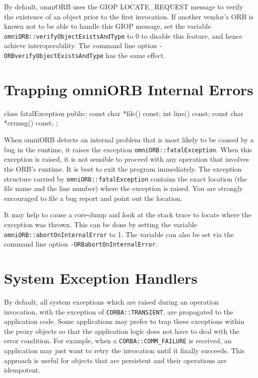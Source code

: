 \documentclass[11pt,twoside,a4paper]{book}
\newcommand{\type}[1]{\texttt{#1}}
\newcommand{\code}[1]{\texttt{#1}}
\newcommand{\cmdline}[1]{\texttt{#1}}
\newcommand{\dsc}{\discretionary{}{}{}}
\begin{document}
By default, omniORB uses the GIOP LOCATE\_REQUEST message to verify
the existence of an object prior to the first invocation. If another
vendor's ORB is known not to be able to handle this GIOP message, set
the variable \code{omniORB::\dsc{}verifyObjectExistsAndType} to 0 to
disable this feature, and hence achieve interoperability. The command
line option \cmdline{-ORBverifyObjectExistsAndType} has the same
effect.



\section{Trapping omniORB Internal Errors}
\label{sec_fatal}

\begin{cxxlisting}
class fatalException {
public:
    const char *file() const;
    int line() const;
    const char *errmsg() const;
};
\end{cxxlisting}

When omniORB detects an internal problem that is most likely to be
caused by a bug in the runtime, it raises the exception
\type{omniORB::fatalException}.  When this exception is raised, it is
not sensible to proceed with any operation that involves the ORB's
runtime. It is best to exit the program immediately. The exception
structure carried by \type{omniORB::fatalException} contains the exact
location (the file name and the line number) where the exception is
raised. You are strongly encouraged to file a bug report and point out
the location.

It may help to cause a core-dump and look at the stack trace to locate
where the exception was thrown. This can be done by setting the
variable \code{omniORB::\dsc{}abortOnInternalError} to 1. The variable
can also be set via the command line option
\cmdline{-ORBabortOnInternalError}.

\mbox{}



\section{System Exception Handlers}

By default, all system exceptions which are raised during an operation
invocation, with the exception of \code{CORBA::TRANSIENT}, are
propagated to the application code. Some applications may prefer to
trap these exceptions within the proxy objects so that the application
logic does not have to deal with the error condition. For example,
when a \code{CORBA::COMM\_FAILURE} is received, an application may
just want to retry the invocation until it finally succeeds. This
approach is useful for objects that are persistent and their
operations are idempotent.
\end{document}
